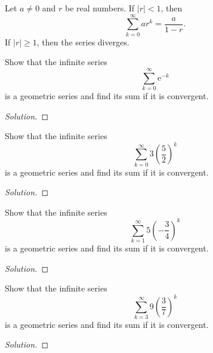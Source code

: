 \documentclass[compacto,10pt,comentarios]{aleph-notas}
\begin{document}
\begin{teo}
    Let $a \neq 0$ and $r$ be real numbers. If $|r| < 1$, then
    $$
        \sum_{k=0}^{\infty} a r^{k} = \frac{a}{1 - r}.
    $$
    If $|r| \geq 1$, then the series diverges.
\end{teo}

\begin{ejer}
    Show that the infinite series
    $$
        \sum_{k=0}^{\infty} \mathrm{e}^{-k}
    $$
    is a geometric series and find its sum if it is convergent.
\end{ejer}
\begin{proof}[Solution]
    
\end{proof}

\begin{ejer}
    Show that the infinite series
    $$
        \sum_{k=0}^{\infty} 3\left(\frac{5}{2}\right)^{k}
    $$
    is a geometric series and find its sum if it is convergent.
\end{ejer}
\begin{proof}[Solution]
    
\end{proof}

\begin{ejer}
    Show that the infinite series
    $$
        \sum_{k=1}^{\infty} 5 \left( - \frac{3}{4} \right)^{k}
    $$
    is a geometric series and find its sum if it is convergent.
\end{ejer}
\begin{proof}[Solution]
    
\end{proof}

\begin{ejer}
    Show that the infinite series
    $$
        \sum_{k=3}^{\infty} 9 \left( \frac{3}{7} \right)^{k}
    $$
    is a geometric series and find its sum if it is convergent.
\end{ejer}
\begin{proof}[Solution]
    
\end{proof}

\begin{ejer}
    
\end{ejer}
\end{document}
